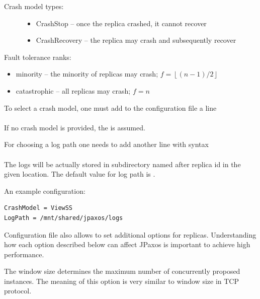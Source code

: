 \begin{description}
\item[{Crash model types:}] \leavevmode\begin{itemize}
\item {} 
CrashStop -- once the replica crashed, it cannot recover

\item {} 
CrashRecovery -- the replica may crash and subsequently recover

\end{itemize}

\end{description}

Fault tolerance ranks:
\begin{itemize}
\item {} 
minority -- the minority of replicas may crash; $f = \left\lfloor (n-1)/2 \right\rfloor$

\item {} 
catastrophic -- all replicas may crash; $f=n$

\end{itemize}

To select a crash model, one must add to the configuration file a line
\\\\ If no crash model is provided, the
 is assumed.

For choosing a log path one needs to add another line with syntax\\ \\ The logs will be actually stored in subdirectory named after replica
id in the given location. The default value for log path is .

An example configuration:

\begin{Verbatim}[commandchars=@\[\]]
CrashModel = ViewSS
LogPath = /mnt/shared/jpaxos/logs
\end{Verbatim}


\label{config:replica-options}
Configuration file also allows to set additional options for replicas.
Understanding how each option described below can affect JPaxos is important to
achieve high performance.


\label{config:window-size}
The window size determines the maximum number of concurrently proposed
instances. The meaning of this option is very similar to window size in TCP
protocol.


